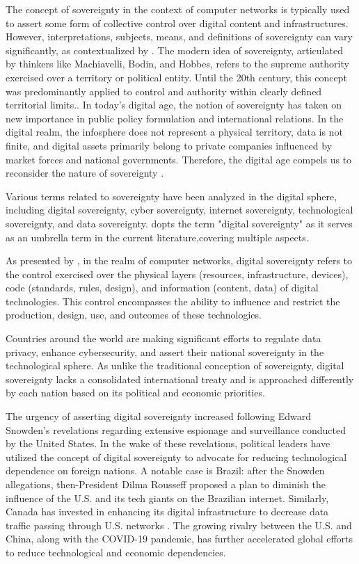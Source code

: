 \documentclass[12pt]{article}
\begin{document}
The concept of sovereignty in the context of computer networks is typically used to assert some form of collective control over digital content and infrastructures. However, interpretations, subjects, means, and definitions of sovereignty can vary significantly, as contextualized by \cite{couture:19}. The modern idea of sovereignty, articulated by thinkers like Machiavelli, Bodin, and Hobbes, refers to the supreme authority exercised over a territory or political entity. Until the 20th century, this concept was predominantly applied to control and authority within clearly defined territorial limits..
In today’s digital age, the notion of sovereignty has taken on new importance in public policy formulation and international relations. In the digital realm, the infosphere does not represent a physical territory, data is not finite, and digital assets primarily belong to private companies influenced by market forces and national governments. Therefore, the digital age compels us to reconsider the nature of sovereignty \cite{floridi:20}.

Various terms related to sovereignty have been analyzed in the digital sphere, including digital sovereignty, cyber sovereignty, internet sovereignty, technological sovereignty, and data sovereignty. \cite{azevedo:24} dopts the term "digital sovereignty" as it serves as an umbrella term in the current literature,covering multiple aspects.

As presented by \cite{floridi:20}, in the realm of computer networks, digital sovereignty refers to the control exercised over the physical layers (resources, infrastructure, devices), code (standards, rules, design), and information (content, data) of digital technologies. This control encompasses the ability to influence and restrict the production, design, use, and outcomes of these technologies.

Countries around the world are making significant efforts to regulate data privacy, enhance cybersecurity, and assert their national sovereignty in the technological sphere. As \cite{aydn:19} unlike the traditional conception of sovereignty, digital sovereignty lacks a consolidated international treaty and is approached differently by each nation based on its political and economic priorities.

The urgency of asserting digital sovereignty increased following Edward Snowden's revelations regarding extensive espionage and surveillance conducted by the United States. In the wake of these revelations, political leaders have utilized the concept of digital sovereignty to advocate for reducing technological dependence on foreign nations. A notable case is Brazil: after the Snowden allegations, then-President Dilma Rousseff proposed a plan to diminish the influence of the U.S. and its tech giants on the Brazilian internet. Similarly, Canada has invested in enhancing its digital infrastructure to decrease data traffic passing through U.S. networks \cite{couture:19}. The growing rivalry between the U.S. and China, along with the COVID-19 pandemic, has further accelerated global efforts to reduce technological and economic dependencies.
\end{document}
